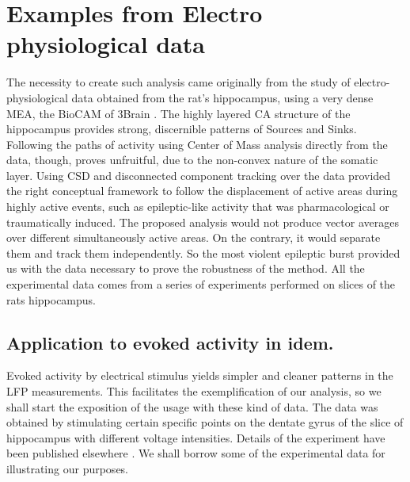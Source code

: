 \documentclass[12pt, letterpaper]{article}
\begin{document}
 
\section{Examples from Electro physiological data}

The necessity to create such analysis came originally from the study of
electro-physiological data obtained from the rat's hippocampus, using
a very dense MEA, the BioCAM of 3Brain \cite{BioCAM}. 
The highly layered CA structure of the hippocampus provides strong, discernible patterns of Sources and Sinks. Following the paths of activity using Center of Mass analysis directly from the data, though, proves unfruitful, due to the non-convex nature of the somatic layer. Using CSD and disconnected component tracking over the data provided the right conceptual framework to follow the displacement of active areas during highly active events, such as epileptic-like activity that was pharmacological
or traumatically induced. The proposed analysis would not produce vector averages over different simultaneously active areas. On the contrary, it would separate them and track them independently. So the most violent epileptic burst provided us with the data necessary to prove the robustness of the method.
All the experimental data comes from a series of experiments
performed on slices of the rats hippocampus. 



\subsection{Application to evoked activity in idem.}\label{sec:evocada}

Evoked activity by electrical stimulus yields simpler and cleaner patterns in the LFP
measurements. This facilitates the exemplification of our analysis, so we shall
start the exposition of the usage with these kind of data.
The data was obtained by stimulating certain specific points on the dentate gyrus
of the slice of hippocampus with different voltage intensities. Details of the experiment
have been published elsewhere \cite{Franco2018}. We shall borrow some of
the experimental data for illustrating our purposes.
\end{document}
